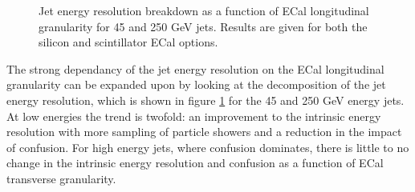 \begin{figure}
\caption[Jet energy resolution breakdown as a function of ECal longitudinal granularity for 45 and 250 GeV jets.  Results are given for both the silicon and scintillator ECal options.]{Jet energy resolution breakdown as a function of ECal longitudinal granularity for 45 and 250 GeV jets.  Results are given for both the silicon and scintillator ECal options.}
\label{fig:ecalnlayersbreak}
\end{figure}

The strong dependancy of the jet energy resolution on the ECal longitudinal granularity can be expanded upon by looking at the decomposition of the jet energy resolution, which is shown in figure \ref{fig:ecalnlayersbreak} for the 45 and 250 GeV energy jets.  At low energies the trend is twofold: an improvement to the intrinsic energy resolution with more sampling of particle showers and a reduction in the impact of confusion.  For high energy jets, where confusion dominates, there is little to no change in the intrinsic energy resolution and confusion as a function of ECal transverse granularity.  


